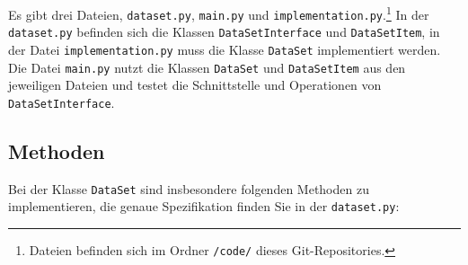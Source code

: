\documentclass[]{article}
\begin{document}
Es gibt drei Dateien, \texttt{dataset.py}, \texttt{main.py} und \texttt{implementation.py}.\footnote{Dateien befinden sich im Ordner \texttt{/code/} dieses Git-Repositories.}
In der \texttt{dataset.py} befinden sich die Klassen \texttt{DataSetInterface} und \texttt{DataSetItem}, in der Datei \texttt{implementation.py} muss die Klasse \texttt{DataSet} implementiert werden. Die Datei \texttt{main.py} nutzt die Klassen \texttt{DataSet} und \texttt{DataSetItem} aus den jeweiligen Dateien und testet die Schnittstelle und Operationen von \texttt{DataSetInterface}.

    \subsection{Methoden}
    
Bei der Klasse \texttt{DataSet} sind insbesondere folgenden Methoden zu implementieren, die genaue Spezifikation finden Sie in der \texttt{dataset.py}:\\
\end{document}
